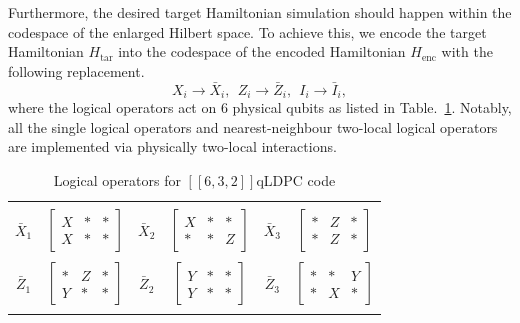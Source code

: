 \documentclass[%
10pt,tightenlines,
superscriptaddress,
 amsmath,amssymb,
 aps,
pra,
]{revtex4-2}
\newcommand{\Htar}{H_{\mathrm{tar}}}
\newcommand{\Henc}{H_{\mathrm{enc}}}
\begin{document}
Furthermore, the desired target Hamiltonian simulation should happen within the codespace of the enlarged Hilbert space. To achieve this, we encode the target Hamiltonian $\Htar$ into the codespace of the encoded Hamiltonian $\Henc$ with the following replacement.
\begin{equation}
    X_i \rightarrow \bar{X}_i,~~ Z_i \rightarrow \bar{Z}_i,~~ I_i \rightarrow \bar{I}_i,
\end{equation}
where the logical operators act on $6$ physical qubits as listed in Table.~\ref{tab:3 logical qubit case}. Notably, all the single logical operators and nearest-neighbour two-local logical operators are implemented via physically two-local interactions. 

\begin{table}[htbp]
    \centering
    \begin{tabular}{||cc|cc|cc||}
    \hline
    &&&&&\\
    $\bar{X}_1$     & $\begin{bmatrix}
       X & *& *\\
        X  & *& *  
    \end{bmatrix}$ & $\bar{X}_2$& $\begin{bmatrix}
          X & * & *\\
        * & * & Z
    \end{bmatrix}$ &  $\bar{X}_3$& $\begin{bmatrix}
        * & Z  & *\\
        *  &Z  & *
    \end{bmatrix}$ \\
     &&&&&\\
          $\bar{Z}_1$     & $\begin{bmatrix}
    * & Z & *\\
        Y  &* & *
    \end{bmatrix}$ & $\bar{Z}_2$& $\begin{bmatrix}
      Y & *&* \\
        Y  &* &*
    \end{bmatrix}$ &  $\bar{Z}_3$& $\begin{bmatrix}
         * & *& Y\\
         * & X& *
    \end{bmatrix}$  \\
     &&&&&\\
     \hline
    \end{tabular}
    \caption{Logical operators for $[[6,3,2]]$qLDPC code}
    \label{tab:3 logical qubit case}
\end{table}
\end{document}
